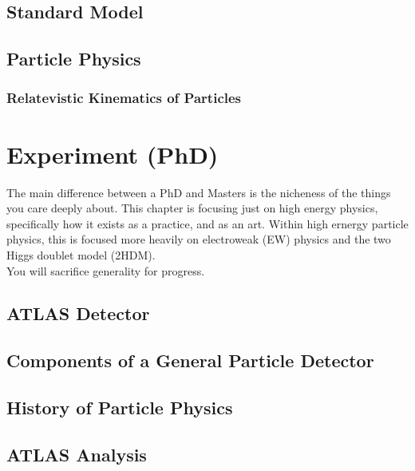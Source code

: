 \documentclass[12pt, a4paper]{book}
\begin{document}
		\section{Standard Model}
		\section{Particle Physics}
			\subsection{Relatevistic Kinematics of Particles}
	\chapter{Experiment (PhD)}
		The main difference between a PhD and Masters is the nicheness of the things you care deeply about. This chapter is focusing just on high energy physics, specifically how it exists as a practice, and as an art. Within high ernergy particle physics, this is focused more heavily on electroweak (EW) physics and the two Higgs doublet model (2HDM).
		\\
		You will sacrifice generality for progress. 
		\section{ATLAS Detector}
		
		\section{Components of a General Particle Detector}
		\newpage
		\section{History of Particle Physics}
		\begin{figure}
			\centering
			
		\end{figure}
		\newpage
		\section{ATLAS Analysis}
			
\end{document}
